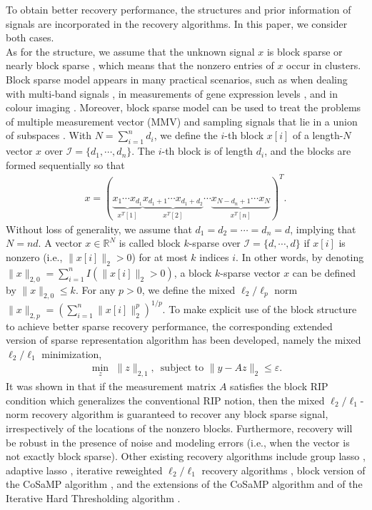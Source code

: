 \documentclass[11pt]{article}
\begin{document}
To obtain better recovery performance, the structures and prior information of signals are incorporated in the recovery algorithms. In this paper, we consider both cases. \\ 
\indent
As for the structure, we assume that the unknown signal $x$ is block sparse or nearly block sparse \cite{de,ekb,em,er,ev}, which means that the nonzero entries of $x$ occur in clusters. Block sparse model appears in many practical scenarios, such as when dealing with multi-band signals \cite{me2}, in measurements of gene expression levels \cite{pvmh}, and in colour imaging \cite{mw}. Moreover, block sparse model can be used to treat the problems of multiple measurement vector (MMV) \cite{ch,em,me1} and sampling signals that lie in a union of subspaces \cite{bd2,em,me2}. With $N=\sum_{i=1}^{n}d_i$, we define the $i$-th block $x[i]$ of a length-$N$ vector $x$ over $\mathcal{I}=\{d_1,\cdots,d_n\}$. The $i$-th block is of length $d_i$, and the blocks are formed sequentially so that
\begin{align}
x=(\underbrace{x_1\cdots x_{d_1}}_{x^{T}[1]}\underbrace{x_{d_1+1}\cdots x_{d_1+d_2}}_{x^{T}[2]}\cdots\underbrace{x_{N-d_n+1}\cdots x_N}_{x^{T}[n]})^T. \label{signal}
\end{align}
Without loss of generality, we assume that $d_1=d_2=\cdots=d_n=d$, implying that $N=nd$. A vector $x\in\mathbb{R}^N$ is called block $k$-sparse over $\mathcal{I}=\{d,\cdots,d\}$ if $x[i]$ is nonzero (i.e., $\lVert x[i]\rVert_2>0$) for at most $k$ indices $i$. In other words, by denoting
$\lVert x\rVert_{2,0}=\sum_{i=1}^{n}I(\lVert x[i]\rVert_2>0)$,
a block $k$-sparse vector $x$ can be defined by $\lVert x\rVert_{2,0}\leq k$. For any $p>0$, we define the mixed $\ell_2/\ell_p$ norm $\lVert x\rVert_{2,p}=(\sum_{i=1}^n\lVert x[i]\rVert_2^p)^{1/p}$. To make explicit use of the block structure to achieve better sparse recovery performance, the corresponding extended version of sparse representation algorithm has been developed, namely the mixed $\ell_2/\ell_1$ minimization, \begin{align}
\min\limits_{z}\,\,\lVert z\rVert_{2,1},\,\,\,\text{subject to $\lVert y-Az\rVert_2\leq \varepsilon$}.
\end{align}
It was shown in \cite{em} that if the measurement matrix $A$ satisfies the block RIP condition which generalizes the
conventional RIP notion, then the mixed $\ell_2/\ell_1$-norm recovery algorithm is guaranteed to recover any block sparse signal, irrespectively of the locations of the nonzero blocks. Furthermore, recovery will be robust in the presence of noise and modeling errors (i.e., when the vector is not exactly block sparse). Other existing recovery algorithms include group lasso \cite{yl}, adaptive lasso \cite{lbw}, iterative reweighted $\ell_2/\ell_1$ recovery algorithms \cite{zb}, block version of the CoSaMP algorithm \cite{ekb}, and the extensions of the CoSaMP algorithm and of the Iterative Hard Thresholding algorithm \cite{bcdh}.
\end{document}

